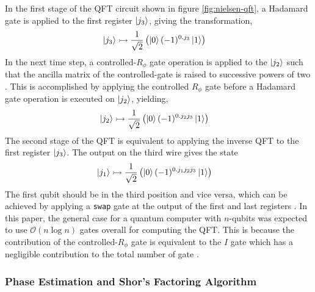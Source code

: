 In the first stage of the QFT circuit shown in figure \ref{fig:nielsen-qft}, a Hadamard gate is applied to the first register $\ket{j_3}$, giving the transformation,
\begin{align}\label{eqn:qft-step-1}
	\ket{j_3} &	\rightarrowtail \frac{1}{\sqrt{2}}\left(\ket{0} (-1)^{0.j_3}\ket{1}\right)
\end{align}
In the next time step, a controlled-$R_\phi$ gate operation is applied to the $\ket{j_2}$ such that the \gls{ancilla} matrix of the controlled-gate is raised to successive powers of two \cite{Nielsen2010}. This is accomplished by applying the controlled $R_\phi$ gate before a Hadamard gate operation is executed on $\ket{j_2}$, yielding,
\begin{align}\label{eqn:qft-step-2}
	\ket{j_2}	& \rightarrowtail \frac{1}{\sqrt{2}}\left(\ket{0} (-1)^{0.j_2j_3}\ket{1}\right)
\end{align}
The second stage of the QFT is equivalent to applying the inverse QFT to the first register $\ket{j_3}$.  The output on the third wire gives the state
\begin{align}\label{eqn:qft-step-3}
	\ket{j_1}	& \rightarrowtail \frac{1}{\sqrt{2}}\left(\ket{0} (-1)^{0.j_1j_2j_3}\ket{1}\right)
\end{align}
The first qubit should be in the third position and vice versa, which can be achieved by applying a \texttt{swap} gate at the output of the first and last registers \cite{DeWolf2019}. In this paper, the general case for a quantum computer with $n$-qubits was expected to use $\mathcal{O}(n\log n)$ gates overall for computing the QFT. This is because the contribution of the controlled-$R_\phi$ gate is equivalent to the $I$ gate which has a negligible contribution to the total number of gate \cite{DeWolf2019}.

\subsubsection{Phase Estimation and Shor's Factoring Algorithm \label{subsubsec:q-shors-algo}}

